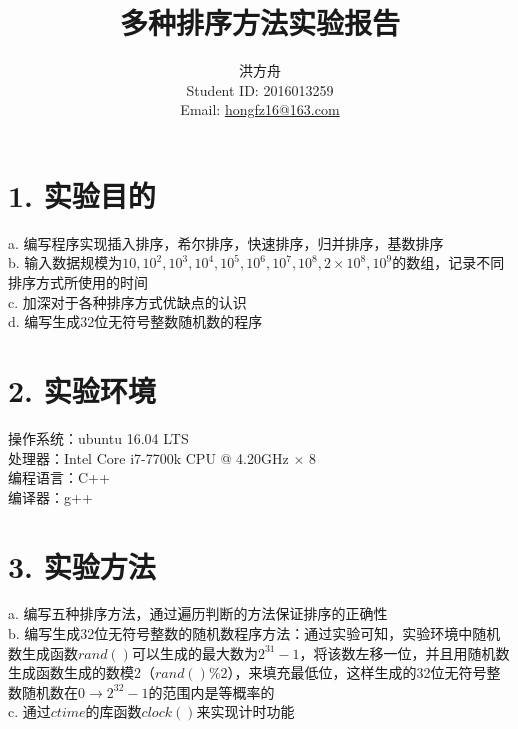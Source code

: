 \documentclass[12pt]{article}
\title{多种排序方法实验报告}
\author{洪方舟\\Student ID: 2016013259\\Email: \href{mailto:hongfz16@163.com}{hongfz16@163.com}}
\begin{document}
  \maketitle
  \section*{1. 实验目的}
  a. 编写程序实现插入排序，希尔排序，快速排序，归并排序，基数排序\\
  b. 输入数据规模为$10,10^2,10^3,10^4,10^5,10^6,10^7,10^8,2\times10^8,10^9$的数组，记录不同排序方式所使用的时间\\
  c. 加深对于各种排序方式优缺点的认识\\
  d. 编写生成32位无符号整数随机数的程序
  \section*{2. 实验环境}
  操作系统：ubuntu 16.04 LTS\\
  处理器：Intel Core i7-7700k CPU @ 4.20GHz $\times$ 8\\
  编程语言：C++\\
  编译器：g++
  \section*{3. 实验方法}
  a. 编写五种排序方法，通过遍历判断的方法保证排序的正确性\\
  b. 编写生成32位无符号整数的随机数程序方法：通过实验可知，实验环境中随机数生成函数$rand()$可以生成的最大数为$2^{31}-1$，将该数左移一位，并且用随机数生成函数生成的数模2（$rand()\%2$），来填充最低位，这样生成的32位无符号整数随机数在$0 \rightarrow 2^{32}-1$的范围内是等概率的\\
  c. 通过$ctime$的库函数$clock()$来实现计时功能
\end{document}
